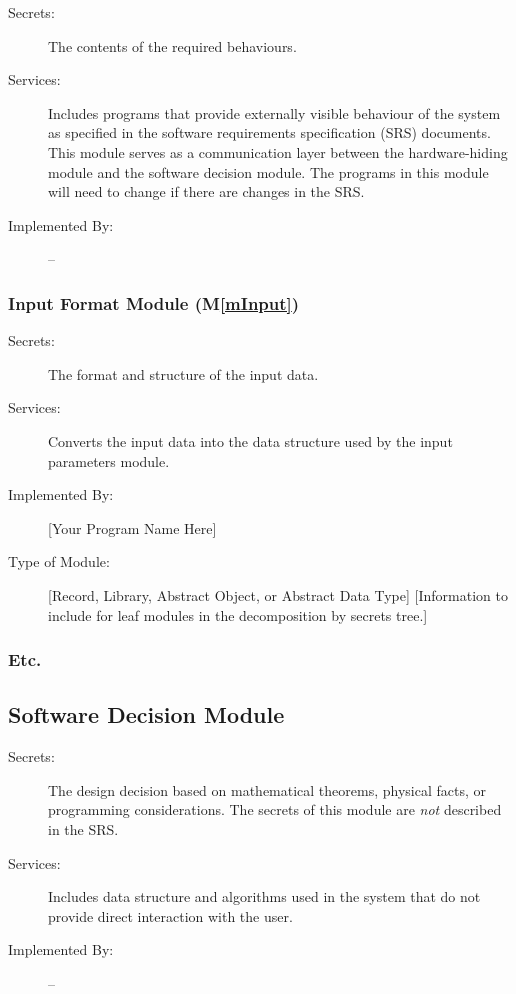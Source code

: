 \documentclass[12pt, titlepage]{article}
\newcommand{\mref}[1]{M\ref{#1}}
\begin{document}
\begin{description}
\item[Secrets:]The contents of the required behaviours.
\item[Services:]Includes programs that provide externally visible behaviour of
  the system as specified in the software requirements specification (SRS)
  documents. This module serves as a communication layer between the
  hardware-hiding module and the software decision module. The programs in this
  module will need to change if there are changes in the SRS.
\item[Implemented By:] --
\end{description}

\subsubsection{Input Format Module (\mref{mInput})}

\begin{description}
\item[Secrets:]The format and structure of the input data.
\item[Services:]Converts the input data into the data structure used by the
  input parameters module.
\item[Implemented By:] [Your Program Name Here]
\item[Type of Module:] [Record, Library, Abstract Object, or Abstract Data Type]
  [Information to include for leaf modules in the decomposition by secrets tree.]
\end{description}

\subsubsection{Etc.}


\subsection{Software Decision Module}

\begin{description}
\item[Secrets:] The design decision based on mathematical theorems, physical
  facts, or programming considerations. The secrets of this module are
  \emph{not} described in the SRS.
\item[Services:] Includes data structure and algorithms used in the system that
  do not provide direct interaction with the user. 
\item[Implemented By:] --
\end{description}
\end{document}

